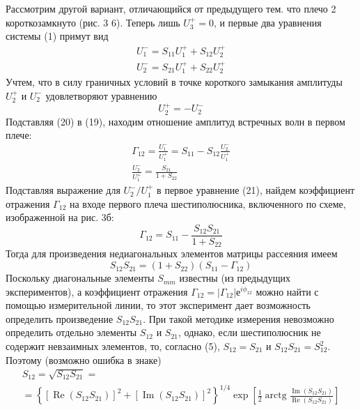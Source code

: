 ﻿\documentclass[a4paper,11pt]{article}
\begin{document}
Рассмотрим другой вариант, отличающийся от предыдущего тем. что плечо 2 короткозамкнуто (рис. 3 6). Теперь лишь $U_3^+=0$, и первые два уравнения системы (1) примут вид
\begin{equation}
	\begin{array} { l } { U _ { 1 } ^ { - } = S _ { 11 } U _ { 1 } ^ { + } + S _ { 12 } U _ { 2 } ^ { + } } \\ { U _ { 2 } ^ { - } = S _ { 21 } U _ { 1 } ^ { + } + S _ { 22 } U _ { 2 } ^ { + } } \end{array}
\end{equation}
Учтем, что в силу граничных условий в точке короткого замыкания амплитуды $U_2^+$ и $U_2^-$ удовлетворяют уравнению
\begin{equation}
	U _ { 2 } ^ { + } = - U _ { 2 } ^ { - }
\end{equation}
Подставляя (20) в (19), находим отношение амплитуд встречных волн в первом плече:
\begin{equation}
	\begin{array} { l } { \Gamma _ { 12 } = \frac { U _ { 1 } ^ { - } } { U _ { 1 } ^ { + } } = S _ { 11 } - S _ { 12 } \frac { U _ { 2 } ^ { - } } { U _ { 1 } ^ { + } } } \\ { \frac { U _ { 2 } ^ { - } } { U _ { 1 } ^ { + } } = \frac { S _ { 21 } } { 1 + S _ { 22 } } } \end{array}
\end{equation}
Подставляя выражение для $U_2^-/U_1^+$ в первое уравнение (21), найдем коэффициент отражения $\Gamma_{12}$ на входе первого плеча шестиполюсника, включенного по схеме, изображенной на рис. 3б:
\begin{equation}
	\Gamma _ { 12 } = S _ { 11 } - \frac { S _ { 12 } S _ { 21 } } { 1 + S _ { 22 } }
\end{equation}
Тогда для произведения недиагональных элементов матрицы рассеяния имеем
\begin{equation}
	S _ { 12 } S _ { 21 } = \left( 1 + S _ { 22 } \right) \left( S _ { 11 } - \Gamma _ { 12 } \right)
\end{equation}
Поскольку диагональные элементы $S_{mm}$ известны (из предыдущих экспериментов), а коэффициент отражения $\Gamma_{12}=|\Gamma_{12}|е^{i\phi_{12}}$ можно найти с помощью измерительной линии, то этот эксперимент дает возможность определить произведение $S_{12}S_{21}$.
При такой методике измерения невозможно определить отдельно элементы $S_{12}$ и $S_{21}$, однако, если шестиполюсник не содержит невзаимных элементов, то, согласно (5), $S_{12} = S_{21}$ и $S_{12}S_{21}=S_{12}^2$. 
Поэтому (возможно ошибка в знаке)
\begin{gather}
	S _ { 12 } = \sqrt { S _ { 12 } S _ { 21 } } = \nonumber \\= \left\{ \left[ \operatorname { Re } \left( S _ { 12 } S _ { 21 } \right) \right] ^ { 2 } + \left[ \operatorname { Im } \left( S _ { 12 } S _ { 21 } \right) \right] ^ { 2 } \right\} ^ { 1 / 4 } \exp \left[ \frac { 1 } { 2 } \operatorname { arctg } \frac { \operatorname { Im } \left( S _ { 12 } S _ { 21 } \right) } { \operatorname { Re } \left( S _ { 12 } S _ { 21 } \right) } \right]
\end{gather}
\end{document}
